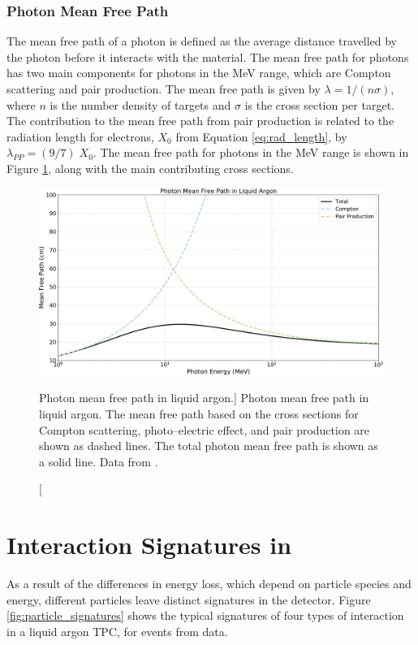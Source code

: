 \subsubsection*{Photon Mean Free Path}
The mean free path of a photon is defined as the average distance travelled by 
the photon before it interacts with the material. The mean free path for 
photons has two main components for photons in the MeV range, which are 
Compton scattering and pair production. The mean free path is given by 
$\lambda = 1 / (n \sigma)$, where $n$ is the number density of targets and 
$\sigma$ is the cross section per target. The contribution to the mean free 
path from pair production is related to the radiation length for electrons, 
$X_0$ from Equation \ref{eq:rad_length}, by $\lambda_{PP} = (9/7) \; 
X_0$\cite{PhysRevD.98.030001}.  The mean free path for photons in the MeV 
range is shown in Figure \ref{fig:photon_mfp}, along with the main 
contributing cross sections. 

\begin{figure}

	\centering

	\includegraphics[width=\textwidth]{figures/photon_mfp.pdf}

	\caption
	[Photon mean free path in liquid argon.]
	{Photon mean free path in liquid argon. The mean free path based on the cross
	sections for Compton scattering, photo--electric effect, and pair production 
	are shown as dashed lines. The total photon mean free path is shown as a 
	solid line. Data from \cite{photon_xsection}.}

	\label{fig:photon_mfp}

\end{figure}

\section{Interaction Signatures in \protodune{}}
As a result of the differences in energy loss, which depend on particle species
and energy, different particles leave distinct signatures in the detector.  
Figure \ref{fig:particle_signatures} shows the typical signatures of four 
types of interaction in a liquid argon TPC, for events from \protodune{} 
data.

